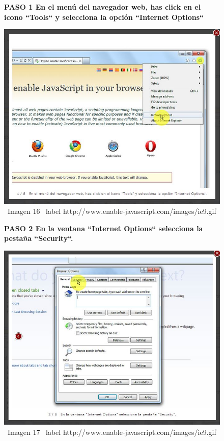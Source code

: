 \documentclass[11pt]{article} %
\begin{document}
\begin{figure}
\begin{center}
\begin{center}
\bf PASO 1
En el menú del navegador web, has click en el icono ``Tools`` y selecciona la opción ``Internet Options``
\end{center}
\includegraphics[height=8 cm, width=8 cm] {imagenes/explorer 01.jpg}
\newline
\newline
\ Imagen 16
\ label {http://www.enable-javascript.com/images/ie9.gif }

\begin{center}
\bf PASO 2
En la ventana ``Internet Options`` selecciona la pestaña ``Security``.
\end{center}

\includegraphics[height=8 cm, width=8 cm] {imagenes/explorer 02.jpg}
\newline
\newline
\ Imagen 17
\ label {http://www.enable-javascript.com/images/ie9.gif }

\end{center}
\end{figure}
\end{document}
